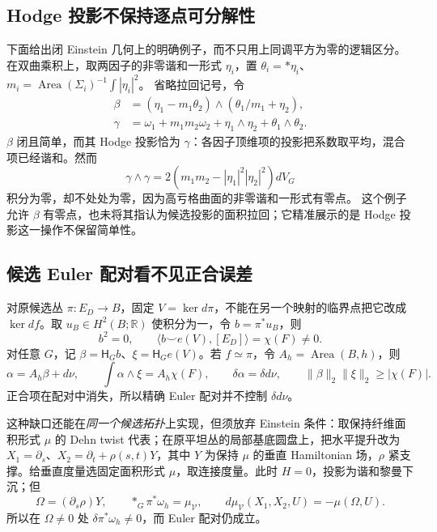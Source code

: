 \documentclass[UTF8,fontset=fandol,zihao=-4,oneside,openany]{ctexbook}
\theoremstyle{cjkplain}
\numberwithin{equation}{chapter}
\begin{document}
\subsection{Hodge 投影不保持逐点可分解性}

下面给出闭 Einstein 几何上的明确例子，而不只用上同调平方为零的逻辑区分。在双曲乘积上，取两因子的非零谐和一形式 $\eta_i$，置
$\theta_i=*\eta_i$、
$m_i=\operatorname{Area}(\Sigma_i)^{-1}\int|\eta_i|^2$。
省略拉回记号，令
\begin{equation}\label{SUB:hodge-simplicity}
\begin{aligned}
\beta&=(\eta_1-m_1\theta_2)\wedge(\theta_1/m_1+\eta_2),\\
\gamma&=\omega_1+m_1m_2\omega_2
+\eta_1\wedge\eta_2+\theta_1\wedge\theta_2.
\end{aligned}
\end{equation}
$\beta$ 闭且简单，而其 Hodge 投影恰为 $\gamma$：各因子顶维项的投影把系数取平均，混合项已经谐和。然而
\[
\gamma\wedge\gamma
=2(m_1m_2-|\eta_1|^2|\eta_2|^2)dV_G
\]
积分为零，却不处处为零，因为高亏格曲面的非零谐和一形式有零点。
这个例子允许 $\beta$ 有零点，也未将其指认为候选投影的面积拉回；它精准展示的是 Hodge 投影这一操作不保留简单性。

\subsection{候选 Euler 配对看不见正合误差}

对原候选丛 $\pi:E_D\to B$，固定 $V=\ker d\pi$，不能在另一个映射的临界点把它改成 $\ker df$。取 $u_B\in H^2(B;\mathbb R)$ 使积分为一，令 $b=\pi^*u_B$，则
\[
b^2=0,\qquad\langle b\smile e(V),[E_D]\rangle=\chi(F)\ne0.
\]
对任意 $G$，记 $\beta=\mathsf H_Gb$、$\xi=\mathsf H_Ge(V)$。若 $f\simeq\pi$，令 $A_h=\operatorname{Area}(B,h)$，则
\begin{equation}\label{SUB:euler-hodge}
\alpha=A_h\beta+d\nu,\qquad
\int\alpha\wedge\xi=A_h\chi(F),\qquad
\delta\alpha=\delta d\nu,
\qquad\|\beta\|_2\|\xi\|_2\ge|\chi(F)|.
\end{equation}
正合项在配对中消失，所以精确 Euler 配对并不控制 $\delta d\nu$。

这种缺口还能在\emph{同一个候选拓扑}上实现，但须放弃 Einstein 条件：取保持纤维面积形式 $\mu$ 的 Dehn twist 代表；在原平坦丛的局部基底圆盘上，把水平提升改为
$X_1=\partial_s$、$X_2=\partial_t+\rho(s,t)Y$，其中 $Y$ 为保持 $\mu$ 的垂直 Hamiltonian 场，$\rho$ 紧支撑。给垂直度量选固定面积形式 $\mu$，取连接度量。此时 $H=0$，投影为谐和黎曼下沉；但
\[
\Omega=(\partial_s\rho)Y,\qquad
*_G\pi^*\omega_h=\mu_{\mathcal V},\qquad
 d\mu_{\mathcal V}(X_1,X_2,U)=-\mu(\Omega,U).
\]
所以在 $\Omega\ne0$ 处 $\delta\pi^*\omega_h\ne0$，而 Euler 配对仍成立。
\end{document}
